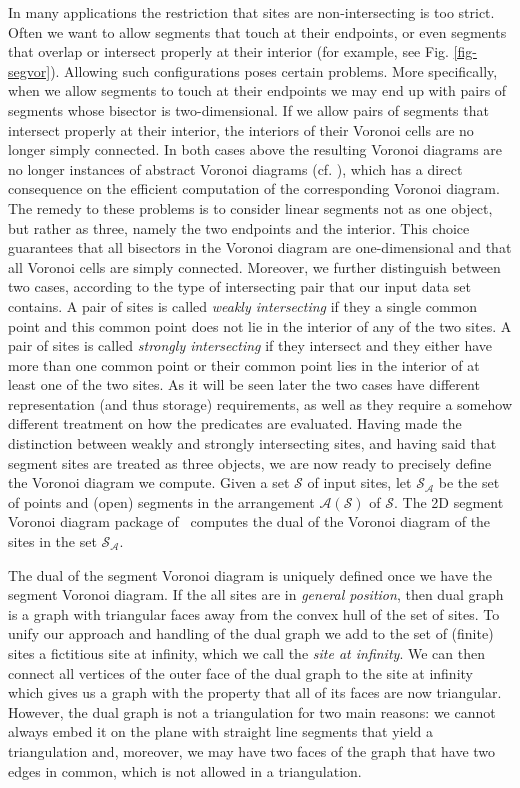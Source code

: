 In many applications the restriction that sites are non-intersecting
is too strict. Often we want to allow segments that touch at their
endpoints, or even segments that overlap or intersect properly at
their interior (for example, see Fig. \ref{fig-segvor}). Allowing such
configurations poses certain problems. More specifically, when we allow
segments to touch at their endpoints we may end up with pairs of
segments whose bisector is two-dimensional. If we allow pairs of
segments that intersect properly at their interior, the interiors of
their Voronoi cells are no longer simply connected. In both cases
above the resulting Voronoi diagrams are no longer instances of
abstract Voronoi diagrams (cf. \cite{k-cavd-89}), which has a direct
consequence on the efficient computation of the corresponding Voronoi
diagram. The remedy to these problems is to consider linear segments
not as one object, but rather as three, namely the two endpoints and
the interior. This choice guarantees that all bisectors in the Voronoi
diagram are one-dimensional and that all Voronoi cells are simply
connected. Moreover, we further distinguish between two cases,
according to the type of intersecting pair that our input data set
contains. A pair of sites is called \emph{weakly intersecting} if they
a single common point and this common point does not lie in the
interior of any of the two sites. A pair of sites is called
\emph{strongly intersecting} if they intersect and they either have
more than one common point or their common point lies in the interior
of at least one of the two sites. As it will be seen later the two
cases have different representation (and thus storage) requirements,
as well as they require a somehow different treatment on how the
predicates are evaluated. Having made the distinction between weakly
and strongly intersecting sites, and having said that segment sites
are treated as three objects, we are now ready to precisely define the
Voronoi diagram we compute. Given a set $\mathcal{S}$ of input sites,
let $\mathcal{S}_{\mathcal{A}}$ be the set of points and
(open) segments in the arrangement $\mathcal{A}(\mathcal{S})$ of
$\mathcal{S}$. The 2D segment Voronoi diagram package of \cgal\
computes the dual of the Voronoi diagram of the sites in the set 
$\mathcal{S}_{\mathcal{A}}$.

The dual of the segment Voronoi diagram is uniquely defined once we
have the segment Voronoi diagram. If the all sites are in
\emph{general position}, then dual graph is a graph with triangular
faces away from the convex hull of the set of sites. To unify our approach
and handling of the dual graph we add to the set of (finite) sites
a fictitious site at infinity, which we call the
{\em site at infinity}. We can then connect all vertices of the outer
face of the dual graph to the site at infinity which gives us
a graph with the property that all of its faces are now
triangular. However, the dual graph is not a triangulation for
two main reasons: we cannot always embed it on the plane with straight
line segments that yield a triangulation and, moreover, we may have two
faces of the graph that have two edges in common, which is not allowed
in a triangulation.

